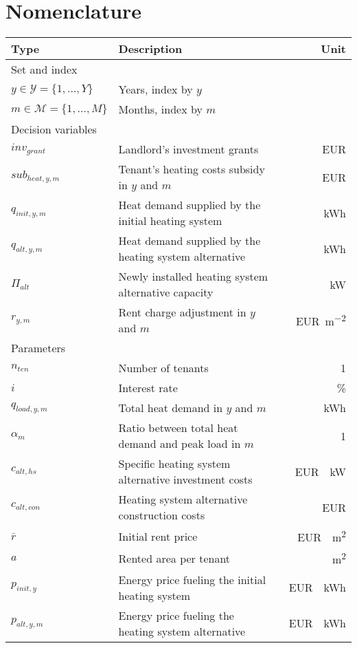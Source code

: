 \documentclass[review]{elsarticle}
\begin{document}
\section*{Nomenclature}
\begin{center}
	\renewcommand{\arraystretch}{1.1}
	\centering
	\small
	\begin{tabular}{lm{8cm}r}
		Type & Description & Unit\\
		\hline
		Set and index & & \\
		\hline
		
		{$y \in \mathcal{Y}=\{1,\ldots,Y\}$} & Years, index by $y$\\
		{$m \in \mathcal{M}=\{1,\ldots,M\}$} & Months, index by $m$\\
		
		\hline
		Decision variables\\
		\hline
		{$inv_{grant}$} & Landlord's investment grants & \SI{}{EUR}\\
		{$sub_{heat,y,m}$} & Tenant's heating costs subsidy in $y$ and $m$ & \SI{}{EUR}\\
		{$q_{init,y,m}$} & Heat demand supplied by the initial heating system & \SI{}{kWh}\\
		{$q_{alt,y,m}$} & Heat demand supplied by the heating system alternative & \SI{}{kWh}\\
		{$\Pi_{alt}$} & Newly installed heating system alternative capacity & \SI{}{kW}\\
		{$r_{y,m}$} & Rent charge adjustment in $y$ and $m$ & \SI{}{EUR\per m^2}\\
		\hline
		Parameters\\
		\hline
		{$n_{ten}$} & Number of tenants & \SI{}{1}\\
		{$i$} & Interest rate & \SI{}{\%}\\
		{$q_{load,y,m}$} & Total heat demand in $y$ and $m$ & \SI{}{kWh}\\
		{$\alpha_{m}$} & Ratio between total heat demand and peak load in $m$ & \SI{}{1}\\
		{$c_{alt,hs}$} & Specific heating system alternative investment costs & \SI{}{EUR \per kW}\\
		{$c_{alt,con}$} & Heating system alternative construction costs & \SI{}{EUR}\\
		{$\bar{r}$} & Initial rent price & \SI{}{EUR \per m^2}\\
		{$a$} & Rented area per tenant & \SI{}{m^2}\\
		{$p_{init,y}$} & Energy price fueling the initial heating system & \SI{}{EUR \per kWh}\\
		{$p_{alt,y,m}$} & Energy price fueling the heating system alternative & \SI{}{EUR \per kWh}\\
		\hline
	\end{tabular}
\end{center}
\newpage
\end{document}
